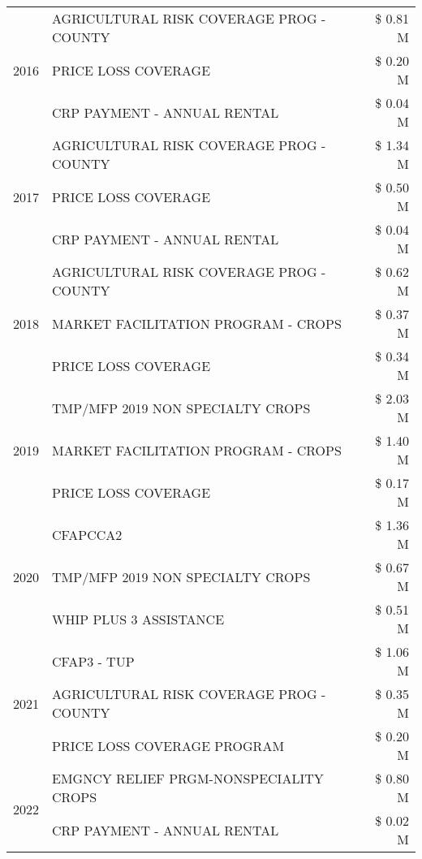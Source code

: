 \begin{tabular}{llr}
\multirow[t]{3}{*}{2016} & AGRICULTURAL RISK COVERAGE PROG - COUNTY & \$ 0.81 M \\
 & PRICE LOSS COVERAGE & \$ 0.20 M \\
 & CRP PAYMENT - ANNUAL RENTAL & \$ 0.04 M \\
\cline{1-3}
\multirow[t]{3}{*}{2017} & AGRICULTURAL RISK COVERAGE PROG - COUNTY & \$ 1.34 M \\
 & PRICE LOSS COVERAGE & \$ 0.50 M \\
 & CRP PAYMENT - ANNUAL RENTAL & \$ 0.04 M \\
\cline{1-3}
\multirow[t]{3}{*}{2018} & AGRICULTURAL RISK COVERAGE PROG - COUNTY & \$ 0.62 M \\
 & MARKET FACILITATION PROGRAM - CROPS & \$ 0.37 M \\
 & PRICE LOSS COVERAGE & \$ 0.34 M \\
\cline{1-3}
\multirow[t]{3}{*}{2019} & TMP/MFP 2019 NON SPECIALTY CROPS & \$ 2.03 M \\
 & MARKET FACILITATION PROGRAM - CROPS & \$ 1.40 M \\
 & PRICE LOSS COVERAGE & \$ 0.17 M \\
\cline{1-3}
\multirow[t]{3}{*}{2020} & CFAPCCA2 & \$ 1.36 M \\
 & TMP/MFP 2019 NON SPECIALTY CROPS & \$ 0.67 M \\
 & WHIP PLUS 3 ASSISTANCE & \$ 0.51 M \\
\cline{1-3}
\multirow[t]{3}{*}{2021} & CFAP3 - TUP & \$ 1.06 M \\
 & AGRICULTURAL RISK COVERAGE PROG - COUNTY & \$ 0.35 M \\
 & PRICE LOSS COVERAGE PROGRAM & \$ 0.20 M \\
\cline{1-3}
\multirow[t]{2}{*}{2022} & EMGNCY RELIEF PRGM-NONSPECIALITY CROPS & \$ 0.80 M \\
 & CRP PAYMENT - ANNUAL RENTAL & \$ 0.02 M \\
\cline{1-3}
\bottomrule
\end{tabular}
